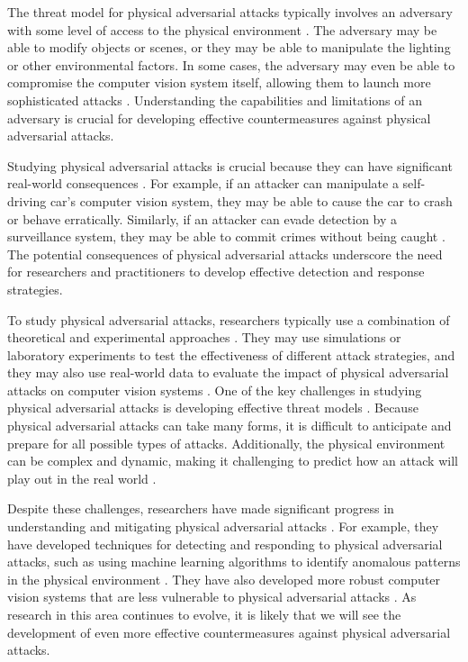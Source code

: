 \documentclass[11pt]{article}
\begin{document}
The threat model for physical adversarial attacks typically involves an adversary with some level of access to the physical environment \cite{ref35}. The adversary may be able to modify objects or scenes, or they may be able to manipulate the lighting or other environmental factors. In some cases, the adversary may even be able to compromise the computer vision system itself, allowing them to launch more sophisticated attacks \cite{ref36}. Understanding the capabilities and limitations of an adversary is crucial for developing effective countermeasures against physical adversarial attacks.

Studying physical adversarial attacks is crucial because they can have significant real-world consequences \cite{ref37}. For example, if an attacker can manipulate a self-driving car's computer vision system, they may be able to cause the car to crash or behave erratically. Similarly, if an attacker can evade detection by a surveillance system, they may be able to commit crimes without being caught \cite{ref38}. The potential consequences of physical adversarial attacks underscore the need for researchers and practitioners to develop effective detection and response strategies.

To study physical adversarial attacks, researchers typically use a combination of theoretical and experimental approaches \cite{ref39}. They may use simulations or laboratory experiments to test the effectiveness of different attack strategies, and they may also use real-world data to evaluate the impact of physical adversarial attacks on computer vision systems \cite{ref40}. One of the key challenges in studying physical adversarial attacks is developing effective threat models \cite{ref41}. Because physical adversarial attacks can take many forms, it is difficult to anticipate and prepare for all possible types of attacks. Additionally, the physical environment can be complex and dynamic, making it challenging to predict how an attack will play out in the real world \cite{ref42}.

Despite these challenges, researchers have made significant progress in understanding and mitigating physical adversarial attacks \cite{ref43}. For example, they have developed techniques for detecting and responding to physical adversarial attacks, such as using machine learning algorithms to identify anomalous patterns in the physical environment \cite{ref44}. They have also developed more robust computer vision systems that are less vulnerable to physical adversarial attacks \cite{ref45}. As research in this area continues to evolve, it is likely that we will see the development of even more effective countermeasures against physical adversarial attacks.
\end{document}
